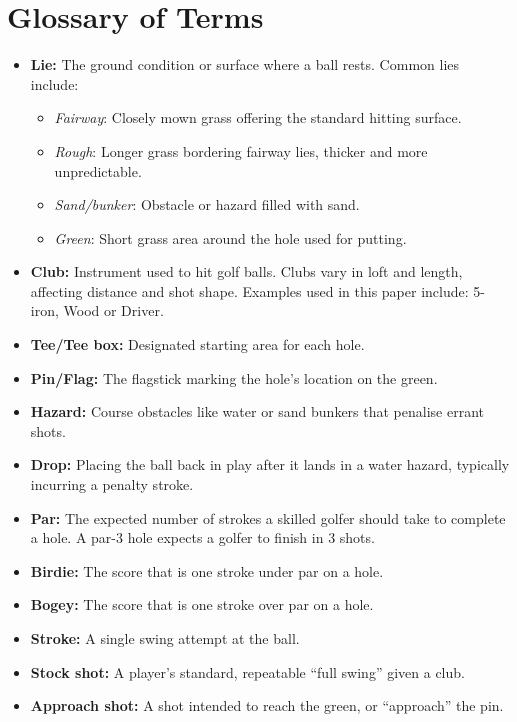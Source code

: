 \documentclass[11pt, letterpaper]{article}
\begin{document}
\section{Glossary of Terms}
\label{sec:Appendix2}

\begin{itemize}[noitemsep]
    \item \textbf{Lie:} The ground condition or surface where a ball rests. Common lies include:
    \begin{itemize}[noitemsep]
        \item\textit{Fairway}: Closely mown grass offering the standard hitting surface.
        \item\textit{Rough}: Longer grass bordering fairway lies, thicker and more unpredictable.
        \item\textit{Sand/bunker}: Obstacle or hazard filled with sand.
        \item\textit{Green}: Short grass area around the hole used for putting.
    \end{itemize}
    \item\textbf{Club:} Instrument used to hit golf balls. Clubs vary in loft and length, affecting distance and shot shape. Examples used in this paper include: 5-iron, Wood or Driver.
    \item\textbf{Tee/Tee box:} Designated starting area for each hole.
    \item\textbf{Pin/Flag:} The flagstick marking the hole's location on the green.
    \item\textbf{Hazard:} Course obstacles like water or sand bunkers that penalise errant shots.
    \item\textbf{Drop:} Placing the ball back in play after it lands in a water hazard, typically incurring a penalty stroke.
    \item \textbf{Par:} The expected number of strokes a skilled golfer should take to complete a hole. A par-3 hole expects a golfer to finish in 3 shots.
    \item \textbf{Birdie:} The score that is one stroke under par on a hole.
    \item \textbf{Bogey:} The score that is one stroke over par on a hole.
    \item\textbf{Stroke:} A single swing attempt at the ball.
    \item\textbf{Stock shot:} A player's standard, repeatable ``full swing'' given a club.
    \item\textbf{Approach shot:} A shot intended to reach the green, or ``approach'' the pin.

\end{itemize}
\end{document}
